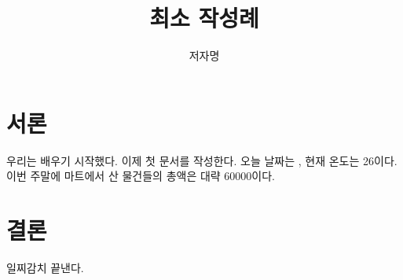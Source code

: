 \documentclass[a4paper]{article}
\author{저자명}
\title{최소 작성례}
\begin{document}
\maketitle
\tableofcontents
\section{서론}
우리는  배우기 시작했다. 이제 첫 문서를
작성한다.
오늘 날짜는 , 현재 온도는 26\textcelsius{}이다. 이번 주말에 마트에서 산 물건들의 총액은 대략 \textwon60000이다.
\section{결론}
일찌감치 끝낸다.
\end{document}
